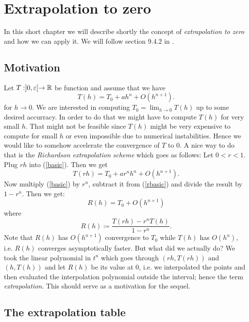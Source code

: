 \chapter{Extrapolation to zero}

In this short chapter we will describe shortly the concept of {\it extrapolation to zero} and how we can apply it. We will follow section 9.4.2 in \cite{dh}.\\

\section{Motivation}

Let \(T: ]0, \varepsilon[ \rightarrow \mathbb{R}\) be function and assume that we have
\begin{equation}\label{basic}
T(h) = T_0 + a h^n + O(h^{n+1}).
\end{equation}
for \(h\rightarrow 0\). We are interested in computing \(T_0 = \lim_{h\rightarrow 0}T(h)\) up to some desired accurracy. In order to do that we might have to compute \(T(h)\) for very small \(h\). That might not be feasible since \(T(h)\) might be very expensive to compute for small \(h\) or even impossible due to numerical instabilities. Hence we would like to somehow accelerate the convergence of \(T\) to \(0\). A nice way to do that is the {\it Richardson extrapolation scheme} which goes as follows: Let \(0 < r < 1\). Plug \(rh\) into (\ref{basic}). Then we get
\begin{equation}\label{rbasic}
T(rh) = T_0 + a r^nh^n + O(h^{n+1}).
\end{equation}
Now multiply (\ref{basic}) by \(r^n\), subtract it from (\ref{rbasic}) and divide the result by \(1 - r^n\). Then we get:
\[
R(h) = T_0 + O(h^{n+1})
\]
where 
\[
R(h) \coloneqq \frac{T(rh) - r^nT(h)}{1 - r^n}.
\]
Note that \(R(h)\) has \(O(h^{n+1})\) convergence to \(T_0\) while \(T(h)\) has \(O(h^n)\), i.e. \(R(h)\) converges asymptotically faster. But what did we actually do? We took the linear polynomial in \(t^n\) which goes through \((rh, T(rh))\) and \((h, T(h))\) and let \(R(h)\) be its value at \(0\), i.e. we interpolated the points and then evaluated the interpolation polynomial outside the interval; hence the term {\it extrapolation}. This should serve as a motivation for the sequel.

\section{The extrapolation table}

